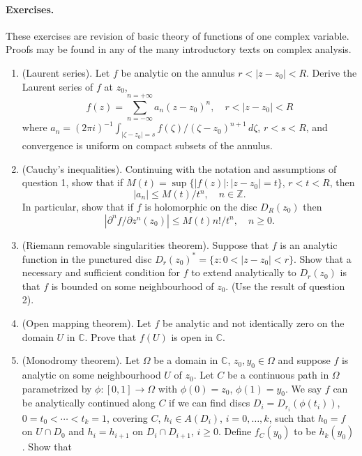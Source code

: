 \paragraph*{Exercises.} These exercises are revision of basic theory of functions of one complex variable. Proofs may be found in any of the many introductory texts on complex analysis.
\begin{enumerate}
\item[(1)] (Laurent series). Let $f$ be analytic on the annulus $r<|z-z_0|<R$. Derive the Laurent series of $f$ at $z_0$,
\[
f(z)=\sum_{n=-\infty}^{n=+\infty}a_n(z-z_0)^n,\quad r<|z-z_0|<R
\]
where $a_n=(2\pi i)^{-1}\int_{|\zeta-z_0|=s}f(\zeta)/(\zeta-z_0)^{n+1}\,d\zeta$, $r<s<R$, and convergence is uniform on compact subsets of the annulus.
\item[(2)] (Cauchy's inequalities). Continuing with the notation and assumptions of question 1, show that if $M(t)=\sup\{|f(z)|:|z-z_0|=t\}$, $r<t<R$, then
\[ |a_n|\leq M(t)/t^n,\quad n\in\mathbb Z. \]
In particular, show that if $f$ is holomorphic on the disc $D_R(z_0)$ then
\[ |\partial^n f/\partial z^n(z_0)|\leq M(t)n!/t^n,\quad n\geq0. \]
\item[(3)] (Riemann removable singularities theorem). Suppose that $f$ is an analytic function in the punctured disc $D_r(z_0)^*=\{z:0<|z-z_0|<r\}$. Show that a necessary and sufficient condition for $f$ to extend analytically to $D_r(z_0)$ is that $f$ is bounded on some neighbourhood of $z_0$. (Use the result of question 2).
\item[(4)] (Open mapping theorem). Let $f$ be analytic and not identically zero on the domain $U$ in $\mathbb C$. Prove that $f(U)$ is open in $\mathbb C$.
\item[(5)] (Monodromy theorem). Let $\Omega$ be a domain in $\mathbb C$, $z_0,y_0\in\Omega$ and suppose $f$ is analytic on some neighbourhood $U$ of $z_0$. Let $C$ be a continuous path in $\Omega$ parametrized by $\phi:[0,1]\to\Omega$ with $\phi(0)=z_0$, $\phi(1)=y_0$. We say $f$ can be analytically continued along $C$ if we can find discs $D_i=D_{r_i}(\phi(t_i))$, $0=t_0<\cdots<t_k=1$, covering $C$, $h_i\in A(D_i)$, $i=0,\ldots,k$, such that $h_0=f$ on $U\cap D_0$ and $h_i=h_{i+1}$ on $D_i\cap D_{i+1}$, $i\geq0$. Define $f_C(y_0)$ to be $h_k(y_0)$. Show that

\end{enumerate}

